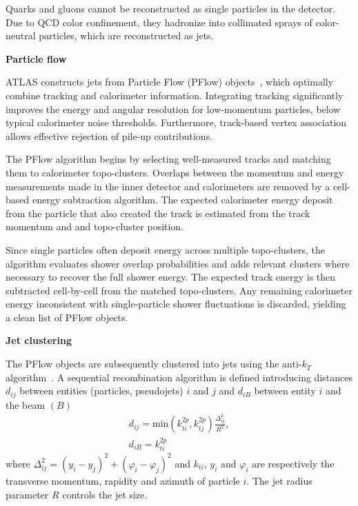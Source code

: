 Quarks and gluons cannot be reconstructed as single particles in the detector.
Due to QCD color confinement, they hadronize into collimated sprays of color-neutral particles, which are reconstructed as jets. 

\vspace{.5cm}
\noindent
\textbf{Particle flow}
\vspace{.5cm}

\noindent
ATLAS constructs jets from Particle Flow (PFlow) objects~\cite{PERF-2015-09}, which optimally combine tracking and calorimeter information. Integrating tracking significantly improves the energy and angular resolution for low-momentum particles, below typical calorimeter noise thresholds.
Furthermore, track-based vertex association allows effective rejection of pile-up contributions.

The PFlow algorithm begins by selecting well-measured tracks and matching them to calorimeter topo-clusters. Overlaps between the momentum and energy measurements made in the inner detector and calorimeters are removed by a cell-based energy subtraction algorithm.
The expected calorimeter energy deposit from the particle that also created the track is estimated from the track momentum and and topo-cluster position.

Since single particles often deposit energy across multiple topo-clusters, the algorithm evaluates shower overlap probabilities and adds relevant clusters where necessary to recover the full shower energy. The expected track energy is then subtracted cell-by-cell from the matched topo-clusters. Any remaining calorimeter energy inconsistent with single-particle shower fluctuations is discarded, yielding a clean list of PFlow objects. 

\vspace{.5cm}
\noindent
\textbf{Jet clustering}
\vspace{.5cm}

\noindent
The PFlow objects are subsequently clustered into jets using the anti-$k_T$ algorithm~\cite{Cacciari:2008gp}.
A sequential recombination algorithm is defined introducing distances $d_{ij}$ between entities (particles, pseudojets) $i$ and $j$ and $d_{iB}$ between entity $i$ and the beam $(B)$
\begin{subequations}
\begin{align}
    d_{ij} = \text{min}(k_{ti}^{2p},k_{tj}^{2p})\frac{\Delta_{ij}^2}{R^2},\\
    d_{iB} = k_{ti}^{2p}
\end{align}
\end{subequations}
where $\Delta^2_{ij} = (y_i - y_j )^2 + (\varphi_i - \varphi_j )^2$ and $k_{ti}$, $y_i$ and $\varphi_i$ are respectively the transverse momentum,
rapidity and azimuth of particle $i$. The jet radius parameter $R$ controls the jet size.

